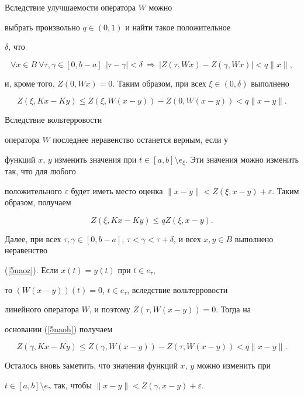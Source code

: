 \begin{pf}


Вследствие улучшаемости оператора $W$ можно


выбрать произвольно $q\in (0, 1)$ и найти такое положительное


$\delta$, что


\begin{equation} \label{5naoh}


\forall x \in B\ \forall \tau,\gamma\in


[0, b-a] \ \ |\tau-\gamma|<\delta\ \Rightarrow


\ |Z(\tau,W x)-Z(\gamma,W x)| < q \| x \|,


\end{equation}


и, кроме того, $Z(0,W x)=0$. Таким образом, при всех $\xi\in


(0, \delta)$ выполнено


$$


Z(\xi,K x-K y) \leqslant Z(\xi, W(x-y))- Z(0, W(x- y))<q \|x-y\|.


$$


Вследствие вольтерровости


оператора $W$ последнее неравенство останется верным, если у


функций $x$, $y$ изменить значения при $t\in [a, b]\setminus


e_\xi$. Эти значения можно изменить так, что для любого


положительного $\varepsilon$ будет иметь место оценка $\|x-y\|<


Z(\xi, x- y)+\varepsilon$. Таким образом, получаем


$$


Z(\xi,K x-K y) \leqslant q Z(\xi, x- y).


$$





Далее, при всех $\tau,\gamma\in [0, b-a]$, $\tau< \gamma<


\tau+\delta$, и всех $x, y\in B$ выполнено неравенство


(\ref{5naoz}). Если $x(t)=y(t)$ при $t\in e_\tau$,


то $(W(x-y))(t)=0$, $t\in e_\tau$, вследствие вольтерровости 


линейного оператора $W$, и поэтому $Z(\tau,W(x-y))=0$. Тогда на


основании (\ref{5naoh}) получаем


$$


Z(\gamma,K x-K y) \leqslant


Z(\gamma, W(x- y))-Z(\tau, W(x- y))<q \|x-y\|.


$$


Осталось вновь заметить, что значения функций $x$, $y$ можно изменить при


$t\in [a, b]\setminus e_\gamma$ так, чтобы $\|x-y\|< Z(\gamma,


x- y)+\varepsilon$.


\end{pf}








